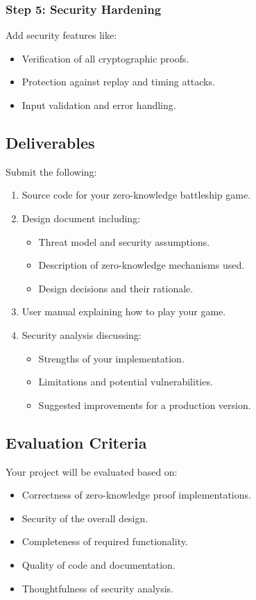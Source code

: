 \documentclass[10pt,a4paper,american]{exam}
\begin{document}
\subsubsection*{Step 5: Security Hardening}
Add security features like:
\begin{itemize}
	\item Verification of all cryptographic proofs.
	\item Protection against replay and timing attacks.
	\item Input validation and error handling.
\end{itemize}

\subsection*{Deliverables}
Submit the following:

\begin{enumerate}
	\item Source code for your zero-knowledge battleship game.
	\item Design document including:
	      \begin{itemize}
		      \item Threat model and security assumptions.
		      \item Description of zero-knowledge mechanisms used.
		      \item Design decisions and their rationale.
	      \end{itemize}
	\item User manual explaining how to play your game.
	\item Security analysis discussing:
	      \begin{itemize}
		      \item Strengths of your implementation.
		      \item Limitations and potential vulnerabilities.
		      \item Suggested improvements for a production version.
	      \end{itemize}
\end{enumerate}

\subsection*{Evaluation Criteria}
Your project will be evaluated based on:

\begin{itemize}
	\item Correctness of zero-knowledge proof implementations.
	\item Security of the overall design.
	\item Completeness of required functionality.
	\item Quality of code and documentation.
	\item Thoughtfulness of security analysis.
\end{itemize}
\end{document}
